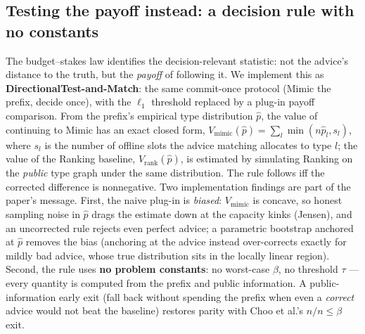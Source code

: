 \subsection{Testing the payoff instead: a decision rule with no
constants}

The budget--stakes law identifies the decision-relevant statistic: not
the advice's distance to the truth, but the \emph{payoff} of following
it. We implement this as \textbf{DirectionalTest-and-Match}: the same
commit-once protocol (Mimic the prefix, decide once), with the
\(\ell_1\) threshold replaced by a plug-in payoff comparison. From the
prefix's empirical type distribution \(\hat p\), the value of continuing
to Mimic has an exact closed form,
\(V_{\mathrm{mimic}}(\hat p)=\sum_l \min(n\hat p_l, s_l)\), where
\(s_l\) is the number of offline slots the advice matching allocates to
type \(l\); the value of the Ranking baseline,
\(V_{\mathrm{rank}}(\hat p)\), is estimated by simulating Ranking on the
\emph{public} type graph under the same distribution. The rule follows
iff the corrected difference is nonnegative. Two implementation findings
are part of the paper's message. First, the naive plug-in is
\emph{biased}: \(V_{\mathrm{mimic}}\) is concave, so honest sampling
noise in \(\hat p\) drags the estimate down at the capacity kinks
(Jensen), and an uncorrected rule rejects even perfect advice; a
parametric bootstrap anchored at \(\hat p\) removes the bias (anchoring
at the advice instead over-corrects exactly for mildly bad advice, whose
true distribution sits in the locally linear region). Second, the rule
uses \textbf{no problem constants}: no worst-case \(\beta\), no
threshold \(\tau\) --- every quantity is computed from the prefix and
public information. A public-information early exit (fall back without
spending the prefix when even a \emph{correct} advice would not beat the
baseline) restores parity with Choo et al.'s \(\hat n/n\le\beta\) exit.

